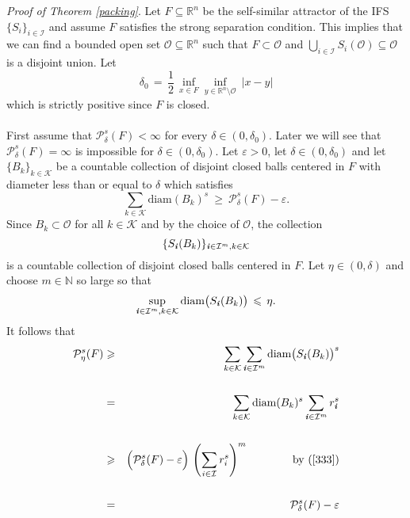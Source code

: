 \documentclass[11pt,english,british]{article}
\numberwithin{equation}{section}
\renewcommand{\geq}{\geqslant}
\renewcommand{\leq}{\leqslant}
\begin{document}
\emph{Proof of Theorem \ref{packing}}.
Let $F \subseteq \mathbb{R}^n$ be the self-similar attractor of the IFS $\{S_i\}_{i \in \mathcal{I}}$ and assume $F$ satisfies the strong separation condition.  This implies that we can find a bounded open set $\mathcal{O} \subseteq \mathbb{R}^n$ such that $F \subset \mathcal{O}$ and $\bigcup_{i \in \mathcal{I}}S_i(\mathcal{O}) \subseteq \mathcal{O}$ is a disjoint union.  Let
\[
\delta_0 \,  =  \, \frac {1}{2} \, \inf_{x \in F} \inf_{y \in\mathbb{R}^n \setminus\mathcal{O}} \  \lvert x-y \rvert
\]
which is strictly positive since $F$ is closed.
\\ \\
First assume that $\mathcal{P}^s_{\delta}(F)<\infty$ for every $\delta \in (0, \delta_0)$. Later we will see that $\mathcal{P}^s_{\delta}(F)=\infty$ is impossible for $\delta \in (0, \delta_0)$. Let $\varepsilon>0$, let $\delta \in (0, \delta_0)$ and let $\{ B_k\}_{k \in \mathcal{K}}$ be a countable collection of disjoint closed balls centered in $F$ with diameter less than or equal to $\delta$ which satisfies
\begin{equation} \label{333}
\sum_{k \in \mathcal{K}} \text{diam}( B_k )^s \  \geq \  \mathcal{P}^s_{\delta}(F) - \varepsilon.
\end{equation}
Since $B_k \subset \mathcal{O}$ for all $k \in \mathcal{K}$ and by the choice of $\mathcal{O}$, the collection
\[
\{ S_\textbf{\emph{i}}(B_k) \}_{\textbf{\emph{i}} \in \mathcal{I}^m, k \in \mathcal{K}}
\]
is a countable collection of disjoint closed balls centered in $F$.  Let $\eta \in (0, \delta)$ and choose $m \in \mathbb{N}$ so large so that
\[
\sup_{\textbf{\emph{i}} \in \mathcal{I}^m, k \in \mathcal{K}}\text{diam}\big(S_\textbf{\emph{i}}(B_k)\big) \, \leq \, \eta.
\]
It follows that
\begin{eqnarray*}
\mathcal{P}^s_{\eta}(F) &\geq&  \sum_{k \in \mathcal{K}} \sum_{\textbf{\emph{i}} \in \mathcal{I}^m} \text{diam}\big( S_\textbf{\emph{i}}(B_k)\big)^s \\ \\
&=&  \sum_{k \in \mathcal{K}} \text{diam}( B_k )^s \sum_{\textbf{\emph{i}} \in \mathcal{I}^m} r_\textbf{\emph{i}}^s  \\ \\
&\geq& \Big(\mathcal{P}^s_{\delta}(F) - \varepsilon \Big) \, \left(\sum_{i \in \mathcal{I}} r_i^s\right)^m \qquad \qquad \text{by (\ref{333})} \\ \\
&=& \mathcal{P}^s_{\delta}(F) - \varepsilon
\end{eqnarray*}
\end{document}
